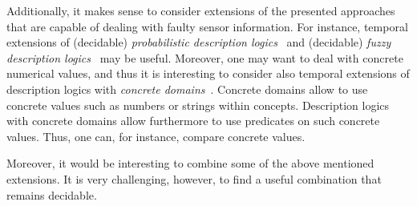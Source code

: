 Additionally, it makes sense to consider extensions of the presented approaches
that are capable of dealing with faulty sensor information.  For instance,
temporal extensions of (decidable) \emph{probabilistic description
logics}~\cite{Luk-AIJ08,LuSc-KR10} and (decidable) \emph{fuzzy description
logics}~\cite{Str-JAIR01,BoSt-FSS09,BDG+-IJUF12,BoPe-JoDS13,BoPe-IJAR14} may be
useful.
%
Moreover, one may want to deal with concrete numerical values, and thus it is
interesting to consider also temporal extensions of description logics with
\emph{concrete
domains}~\cite{BaHa-IJCAI91,Lut-AiML02,BaSa-IS03,Lut-ToCL04,LAHS-JAIR05,LuMi-JAR07}.
Concrete domains allow to use concrete values such as numbers or strings within
concepts.  Description logics with concrete domains allow furthermore to use
predicates on such concrete values. Thus, one can, for instance, compare
concrete values.

Moreover, it would be interesting to combine some of the above mentioned
extensions.  It is very challenging, however, to find a useful combination that
remains decidable.
